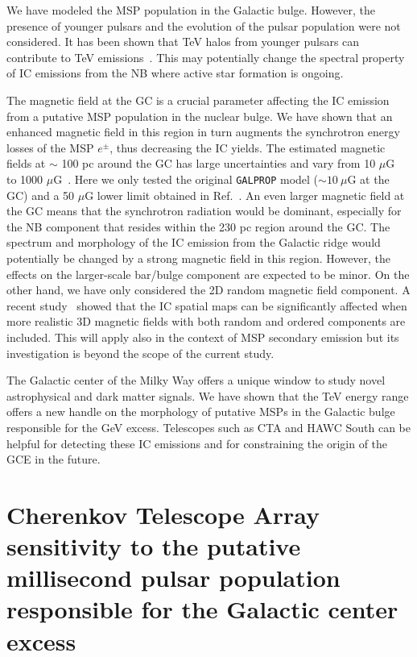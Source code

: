 \documentclass[doublespace,nopageskip]{VTthesis} %
\begin{document}
We have modeled the MSP population in the Galactic bulge. However, the presence of younger pulsars and the evolution of the pulsar population were not considered. It has been shown that TeV halos from younger pulsars can contribute to TeV emissions~\cite{Hooper:2017rzt}. This may potentially change the spectral property of IC emissions from the NB where active star formation is ongoing.

The magnetic field at the GC is a crucial parameter affecting the IC emission from a putative MSP population in the nuclear bulge. We have shown that an enhanced magnetic field in this region in turn augments the synchrotron energy losses of the MSP $e^\pm$, thus decreasing the IC yields. The estimated magnetic fields at $\sim$ 100 pc around the GC has large uncertainties and vary from 10 $\mu$G~\cite{LaRosa:2005ai} to 1000 $\mu$G~\cite{Morris1989fd}. Here we only tested the original \texttt{GALPROP} model ($\sim 10\ \mu$G at the GC) and a 50 $\mu$G lower limit obtained in Ref.~\cite{Crocker:2010xc}. An even larger magnetic field at the GC means that the synchrotron radiation would be dominant, especially for the NB component that resides within the 230 pc region around the GC. The spectrum and morphology of the IC emission from the Galactic ridge would potentially be changed by a strong magnetic field in this region. However, the effects on the larger-scale bar/bulge component are expected to be minor. On the other hand, we have only considered the 2D random magnetic field component. A recent study~\cite{Orlando:2019vmq} showed that the IC spatial maps can be significantly affected when more realistic 3D magnetic fields with both random and ordered components are included. This will apply also in the context of MSP secondary emission but its investigation is beyond the scope of the current study.

The Galactic center of the Milky Way offers a unique window to study novel astrophysical and dark matter signals. We have shown that the TeV energy range offers a new handle on the morphology of putative MSPs in the Galactic bulge responsible for the GeV excess. Telescopes such as CTA and HAWC South can be helpful for detecting these IC emissions and for constraining the origin of the GCE in the future.

\chapter{Cherenkov Telescope Array sensitivity to the putative millisecond pulsar population responsible for the Galactic center excess}\label{ch:CTA}
\end{document}
